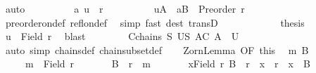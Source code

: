 \begin{isabellebody}
\ auto\isanewline
\ \ \ \ \ \ \isamarkupfalse%
\ \isamarkupfalse%
\ {\isachardoublequoteopen}{\isacharparenleft}{\kern0pt}a{\isacharcomma}{\kern0pt}\ u{\isacharparenright}{\kern0pt}\ {\isasymin}\ r{\isachardoublequoteclose}\isanewline
\ \ \ \ \ \ \ \ \isamarkupfalse%
\ uA\ \ aB\ \ {\isacartoucheopen}Preorder\ r{\isacartoucheclose}\isanewline
\ \ \ \ \ \ \ \ \isamarkupfalse%
\ preorder{\isacharunderscore}{\kern0pt}on{\isacharunderscore}{\kern0pt}def\ refl{\isacharunderscore}{\kern0pt}on{\isacharunderscore}{\kern0pt}def\ \isamarkupfalse%
\ simp\ {\isacharparenleft}{\kern0pt}fast\ dest{\isacharcolon}{\kern0pt}\ transD{\isacharparenright}{\kern0pt}\isanewline
\ \ \ \ \isamarkupfalse%
\isanewline
\ \ \ \ \isamarkupfalse%
\ \isamarkupfalse%
\ {\isacharquery}{\kern0pt}thesis\isanewline
\ \ \ \ \ \ \isamarkupfalse%
\ {\isacartoucheopen}u\ {\isasymin}\ Field\ r{\isacartoucheclose}\ \isamarkupfalse%
\ blast\isanewline
\ \ \isamarkupfalse%
\isanewline
\ \ \isamarkupfalse%
\ \isamarkupfalse%
\ {\isachardoublequoteopen}{\isasymforall}C{\isasymin}chains\ {\isacharquery}{\kern0pt}S{\isachardot}{\kern0pt}\ {\isasymexists}U{\isasymin}{\isacharquery}{\kern0pt}S{\isachardot}{\kern0pt}\ {\isasymforall}A{\isasymin}C{\isachardot}{\kern0pt}\ A\ {\isasymsubseteq}\ U{\isachardoublequoteclose}\isanewline
\ \ \ \ \isamarkupfalse%
\ {\isacharparenleft}{\kern0pt}auto\ simp{\isacharcolon}{\kern0pt}\ chains{\isacharunderscore}{\kern0pt}def\ chain{\isacharunderscore}{\kern0pt}subset{\isacharunderscore}{\kern0pt}def{\isacharparenright}{\kern0pt}\isanewline
\ \ \isamarkupfalse%
\ Zorn{\isacharunderscore}{\kern0pt}Lemma{}\ {\isacharbrackleft}{\kern0pt}OF\ this{\isacharbrackright}{\kern0pt}\ \isamarkupfalse%
\ m\ B\isanewline
\ \ \ \ \ {\isachardoublequoteopen}m\ {\isasymin}\ Field\ r{\isachardoublequoteclose}\isanewline
\ \ \ \ \ \ \ {\isachardoublequoteopen}B\ {\isacharequal}{\kern0pt}\ r{\isasyminverse}\ {\isacharbackquote}{\kern0pt}{\isacharbackquote}{\kern0pt}\ {\isacharbraceleft}{\kern0pt}m{\isacharbraceright}{\kern0pt}{\isachardoublequoteclose}\isanewline
\ \ \ \ \ \ \ {\isachardoublequoteopen}{\isasymforall}x{\isasymin}Field\ r{\isachardot}{\kern0pt}\ B\ {\isasymsubseteq}\ r{\isasyminverse}\ {\isacharbackquote}{\kern0pt}{\isacharbackquote}{\kern0pt}\ {\isacharbraceleft}{\kern0pt}x{\isacharbraceright}{\kern0pt}\ {\isasymlongrightarrow}\ r{\isasyminverse}\ {\isacharbackquote}{\kern0pt}{\isacharbackquote}{\kern0pt}\ {\isacharbraceleft}{\kern0pt}x{\isacharbraceright}{\kern0pt}\ {\isacharequal}{\kern0pt}\ B{\isachardoublequoteclose}\isanewline

\end{isabellebody}
